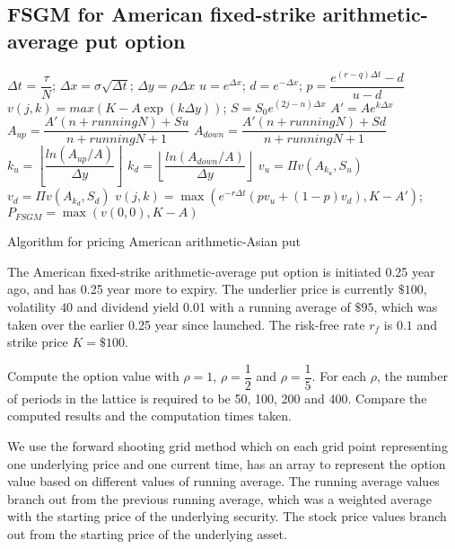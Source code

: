 \subsection{FSGM for American fixed-strike arithmetic-average put option}

\begin{algorithm}[H]
	$\Delta t$ = $\dfrac{\tau}{N}$;
	$\Delta x = \sigma \sqrt{\Delta t}$;
	$\Delta y = \rho \Delta x$\;
	$u = e^{\Delta x}$;
	$d = e^{-\Delta x}$;
	$p = \dfrac{e^{(r-q) \Delta t} - d}{u - d}$\;
	 {
		 {
			$v(j, k) = max(K - A \exp(k \Delta y))$;
		}
	}
	 {
		 {
			 {
				$S = S_{0} e^{(2j - n) \Delta x}$\;
				$A' = A e^{k \Delta x}$\;
				$A_{up} = \dfrac{A' (n + runningN) + Su}{n + runningN + 1}$\;
				$A_{down} = \dfrac{A' (n + runningN) + Sd}{n + runningN + 1}$\;
				$k_{u} = \left\lfloor\dfrac{ln(A_{up}/{A})}{\Delta y}\right\rfloor$\;
				$k_{d} = \left\lfloor\dfrac{ln(A_{down}/{A})}{\Delta y}\right\rfloor$\;
				$v_{u} = \Pi v(A_{k_{u}}, S_{u})$\;
				$v_{d} = \Pi v(A_{k_{d}}, S_{d})$\;
				$v(j,k) = \max(e^{-r \Delta t} (pv_{u} + (1-p)v_{d}), K - A')$;
			}
		}
	}
	$P_{FSGM} = \max(v(0,0), K - A)$\;
\caption{Algorithm for pricing American arithmetic-Asian put}
\end{algorithm}

The American fixed-strike arithmetic-average put option is initiated 0.25 year ago, and has 0.25 year more to expiry. The underlier price is currently $\$100$, volatility $40$ and dividend yield 0.01 with a running average of $\$95$, which was taken over the earlier 0.25 year since launched. The risk-free rate $r_f$ is $0.1$ and strike price $K=
\$100$.

Compute the option value with $\rho=1$, $\rho=\dfrac{1}{2}$ and $\rho = \dfrac{1}{5}$. For each $\rho$, the number of periods in the lattice is required to be 50, 100, 200 and 400. Compare the computed results and the computation times taken.

We use the forward shooting grid method which on each grid point representing one underlying price and one current time, has an array to represent the option value based on different values of running average. The running average values branch out from the previous running average, which was a weighted average with the starting price of the underlying security. The stock price values branch out from the starting price of the underlying asset.

